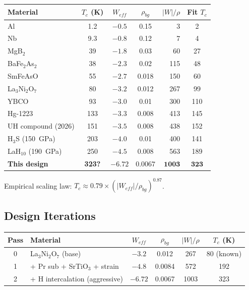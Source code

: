 \documentclass[11pt, a4paper]{article}
\begin{document}
\begin{center}
\begin{tabular}{@{}lcccrc@{}}
\toprule
\textbf{Material} & $T_c$ (K) & $W_{eff}$ & $\rho_{bg}$ &
  $|W|/\rho$ & \textbf{Fit $T_c$} \\
\midrule
Al & 1.2 & $-0.5$ & 0.15 & 3 & 2 \\
Nb & 9.3 & $-0.8$ & 0.12 & 7 & 4 \\
MgB$_2$ & 39 & $-1.8$ & 0.03 & 60 & 27 \\
BaFe$_2$As$_2$ & 38 & $-2.3$ & 0.02 & 115 & 48 \\
SmFeAsO & 55 & $-2.7$ & 0.018 & 150 & 60 \\
La$_3$Ni$_2$O$_7$ & 80 & $-3.2$ & 0.012 & 267 & 99 \\
YBCO & 93 & $-3.0$ & 0.01 & 300 & 110 \\
Hg-1223 & 133 & $-3.3$ & 0.008 & 413 & 145 \\
UH compound (2026) & 151 & $-3.5$ & 0.008 & 438 & 152 \\
H$_3$S (150~GPa) & 203 & $-4.0$ & 0.01 & 400 & 141 \\
LaH$_{10}$ (190~GPa) & 250 & $-4.5$ & 0.008 & 563 & 189 \\
\midrule
\textbf{This design} & \textbf{323?} & $\mathbf{-6.72}$ &
  $\mathbf{0.0067}$ & $\mathbf{1003}$ & $\mathbf{323}$ \\
\bottomrule
\end{tabular}
\end{center}

Empirical scaling law: $T_c \approx 0.79 \times (|W_{eff}|/\rho_{bg})^{0.87}$.

\subsection{Design Iterations}

\begin{center}
\begin{tabular}{@{}clcccc@{}}
\toprule
\textbf{Pass} & \textbf{Material} & $W_{eff}$ & $\rho_{bg}$ &
  $|W|/\rho$ & $T_c$ (K) \\
\midrule
0 & La$_3$Ni$_2$O$_7$ (base) & $-3.2$ & 0.012 & 267 & 80 (known) \\
1 & + Pr sub + SrTiO$_3$ + strain & $-4.8$ & 0.0084 & 572 & 192 \\
2 & + H intercalation (aggressive) & $-6.72$ & 0.0067 & 1003 & 323 \\
\bottomrule
\end{tabular}
\end{center}
\end{document}
